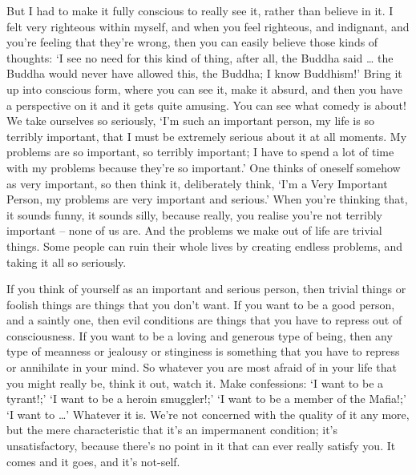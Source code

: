 But I had to make it fully conscious to really see it, rather than believe in it. I felt very righteous within myself, and when you feel righteous, and indignant, and you're feeling that they're wrong, then you can easily believe those kinds of thoughts: `I see no need for this kind of thing, after all, the Buddha said \ldots{} the Buddha would never have allowed this, the Buddha; I know Buddhism!' Bring it up into conscious form, where you can see it, make it absurd, and then you have a perspective on it and it gets quite amusing. You can see what comedy is about! We take ourselves so seriously, `I'm such an important person, my life is so terribly important, that I must be extremely serious about it at all moments. My problems are so important, so terribly important; I have to spend a lot of time with my problems because they're so important.' One thinks of oneself somehow as very important, so then think it, deliberately think, `I'm a Very Important Person, my problems are very important and serious.' When you're thinking that, it sounds funny, it sounds silly, because really, you realise you're not terribly important -- none of us are. And the problems we make out of life are trivial things. Some people can ruin their whole lives by creating endless problems, and taking it all so seriously.

If you think of yourself as an important and serious person, then trivial things or foolish things are things that you don't want. If you want to be a good person, and a saintly one, then evil conditions are things that you have to repress out of consciousness. If you want to be a loving and generous type of being, then any type of meanness or jealousy or stinginess is something that you have to repress or annihilate in your mind. So whatever you are most afraid of in your life that you might really be, think it out, watch it. Make confessions: `I want to be a tyrant!;' `I want to be a heroin smuggler!;' `I want to be a member of the Mafia!;' `I want to \ldots{}' Whatever it is. We're not concerned with the quality of it any more, but the mere characteristic that it's an impermanent condition; it's unsatisfactory, because there's no point in it that can ever really satisfy you. It comes and it goes, and it's not-self.


